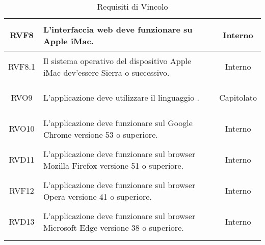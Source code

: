 \begin{longtable}{|c|>{\centering}m{7cm}|c|}
	\hypertarget{RVF8}{RVF8} & L'interfaccia web deve funzionare su Apple iMac. & Interno\\ \hline
	\hypertarget{RVF8.1}{RVF8.1} & Il sistema operativo del dispositivo Apple iMac dev'essere \gl{macOS} Sierra o successivo. & Interno\\ \hline
	\hypertarget{RVO9}{RVO9} & L'applicazione deve utilizzare il linguaggio \gl{JavaScript}. & Capitolato\\ \hline
	\hypertarget{RVO10}{RVO10} & L'applicazione deve funzionare sul \gl{browser} Google Chrome versione 53 o superiore. & Interno\\ \hline
	\hypertarget{RVD11}{RVD11} & L'applicazione deve funzionare sul browser Mozilla Firefox versione 51 o superiore. & Interno\\ \hline
	\hypertarget{RVF12}{RVF12} & L'applicazione deve funzionare sul browser Opera versione 41 o superiore. & Interno\\ \hline
	\hypertarget{RVD13}{RVD13} & L'applicazione deve funzionare sul browser Microsoft Edge versione 38 o superiore. & Interno\\ \hline
	
	\caption[Requisiti di Vincolo]{Requisiti di Vincolo}
	\label{tabella:req3}
\end{longtable}
\clearpage
